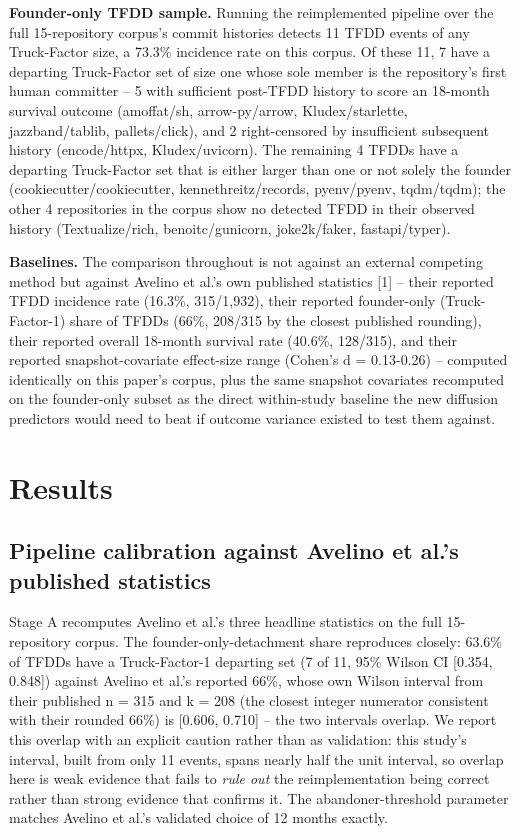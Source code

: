 \documentclass[11pt,letterpaper]{article}
\begin{document}
\textbf{Founder-only TFDD sample.} Running the reimplemented pipeline over the full 15-repository corpus's commit histories detects 11 TFDD events of any Truck-Factor size, a 73.3\% incidence rate on this corpus. Of these 11, 7 have a departing Truck-Factor set of size one whose sole member is the repository's first human committer -- 5 with sufficient post-TFDD history to score an 18-month survival outcome (amoffat/sh, arrow-py/arrow, Kludex/starlette, jazzband/tablib, pallets/click), and 2 right-censored by insufficient subsequent history (encode/httpx, Kludex/uvicorn). The remaining 4 TFDDs have a departing Truck-Factor set that is either larger than one or not solely the founder (cookiecutter/cookiecutter, kennethreitz/records, pyenv/pyenv, tqdm/tqdm); the other 4 repositories in the corpus show no detected TFDD in their observed history (Textualize/rich, benoitc/gunicorn, joke2k/faker, fastapi/typer).

\textbf{Baselines.} The comparison throughout is not against an external competing method but against Avelino et al.'s own published statistics [1] -- their reported TFDD incidence rate (16.3\%, 315/1,932), their reported founder-only (Truck-Factor-1) share of TFDDs (66\%, 208/315 by the closest published rounding), their reported overall 18-month survival rate (40.6\%, 128/315), and their reported snapshot-covariate effect-size range (Cohen's d = 0.13-0.26) -- computed identically on this paper's corpus, plus the same snapshot covariates recomputed on the founder-only subset as the direct within-study baseline the new diffusion predictors would need to beat if outcome variance existed to test them against.

\section{Results}

\subsection{Pipeline calibration against Avelino et al.'s published statistics}

Stage A recomputes Avelino et al.'s three headline statistics on the full 15-repository corpus. The founder-only-detachment share reproduces closely: 63.6\% of TFDDs have a Truck-Factor-1 departing set (7 of 11, 95\% Wilson CI [0.354, 0.848]) against Avelino et al.'s reported 66\%, whose own Wilson interval from their published n = 315 and k = 208 (the closest integer numerator consistent with their rounded 66\%) is [0.606, 0.710] -- the two intervals overlap. We report this overlap with an explicit caution rather than as validation: this study's interval, built from only 11 events, spans nearly half the unit interval, so overlap here is weak evidence that fails to \emph{rule out} the reimplementation being correct rather than strong evidence that confirms it. The abandoner-threshold parameter matches Avelino et al.'s validated choice of 12 months exactly.
\end{document}
